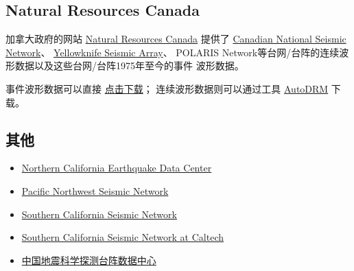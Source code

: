 \subsection{Natural Resources Canada}
\label{subsec:nrcan}
加拿大政府的网站 \href{http://www.nrcan.gc.ca/home}{Natural Resources Canada}
提供了
\href{http://www.earthquakescanada.nrcan.gc.ca/stndon/CNSN-RNSC/index-eng.php}{Canadian National Seismic Network}、
\href{http://can-ndc.nrcan.gc.ca/yka/index-en.php}{Yellowknife Seismic Array}、
POLARIS Network等台网/台阵的连续波形数据以及这些台网/台阵1975年至今的事件
波形数据。

事件波形数据可以直接 \href{http://www.earthquakescanada.nrcan.gc.ca/stndon/NWFA-ANFO/eve/index-eng.php}{点击下载}；
连续波形数据则可以通过工具
\href{http://www.earthquakescanada.nrcan.gc.ca/stndon/AutoDRM/index-eng.php}{AutoDRM} 下载。

\subsection{其他}
\begin{itemize}
\item \href{http://www.ncedc.org/}{Northern California Earthquake Data Center}
\item \href{http://pnsn.org/}{Pacific Northwest Seismic Network}
\item \href{http://www.scsn.org/}{Southern California Seismic Network}
\item \href{http://scedc.caltech.edu/}{Southern California Seismic Network at Caltech}
\item \href{http://www.chinarraydmc.org/}{中国地震科学探测台阵数据中心}
\end{itemize}
